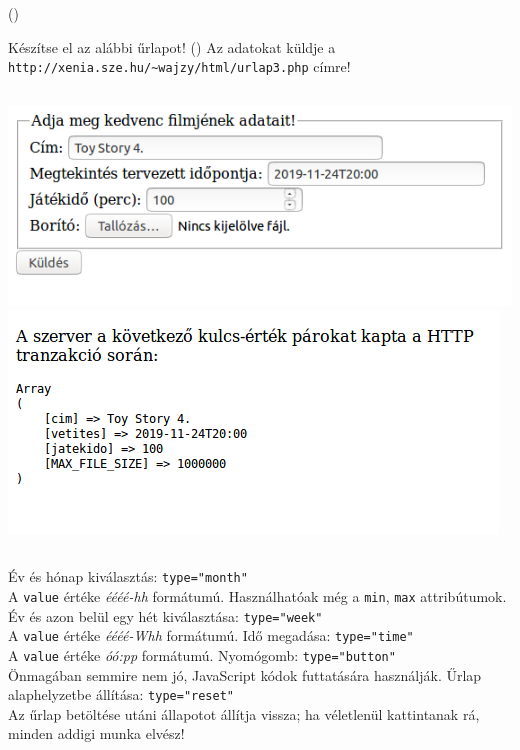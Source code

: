 \begin{frame}
  \begin{exampleblock}{ ()}
    \footnotesize
    
  \end{exampleblock}
\end{frame}

\begin{frame}
  \begin{exampleblock}{Készítse el az alábbi űrlapot! ()}
    Az adatokat küldje a \texttt{http://xenia.sze.hu/\textasciitilde wajzy/html/urlap3.php} címre!
    \begin{columns}[T]
        \includegraphics[width=\textwidth]{urlap4-1.png}
        \includegraphics[width=\textwidth]{urlap4-2.png}
    \end{columns} 
  \end{exampleblock}
\end{frame}

\begin{frame}
  Év és hónap kiválasztás: \texttt{type="month"}\\
  A \texttt{value} értéke \emph{éééé-hh} formátumú. Használhatóak még a \texttt{min}, \texttt{max} attribútumok.
  \vfill
  Év és azon belül egy hét kiválasztása: \texttt{type="week"}\\
  A \texttt{value} értéke \emph{éééé-Whh} formátumú.
  \vfill
  Idő megadása: \texttt{type="time"}\\
  A \texttt{value} értéke \emph{óó:pp} formátumú.
  \vfill
  Nyomógomb: \texttt{type="button"}\\
  Önmagában semmire nem jó, JavaScript kódok futtatására használják.
  \vfill
  Űrlap alaphelyzetbe állítása: \texttt{type="reset"}\\
  Az űrlap betöltése utáni állapotot állítja vissza; ha véletlenül kattintanak rá, minden addigi munka elvész!
\end{frame}

